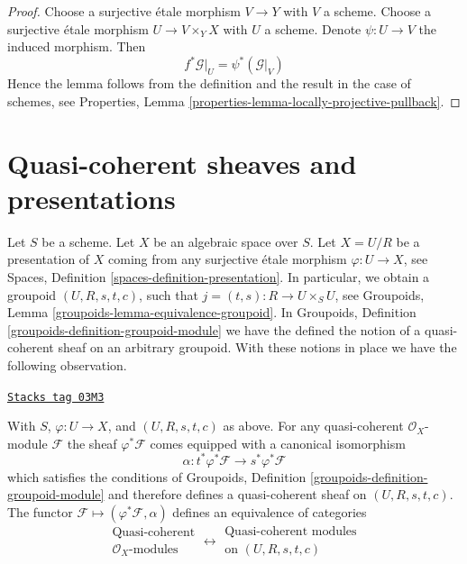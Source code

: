 \begin{proof}
Choose a surjective \'etale morphism $V \to Y$ with $V$ a scheme.
Choose a surjective \'etale morphism $U \to V \times_Y X$ with
$U$ a scheme. Denote $\psi : U \to V$ the induced morphism.
Then
$$
f^*\mathcal{G}|_U = \psi^*(\mathcal{G}|_V)
$$
Hence the lemma follows from the definition and the result in the
case of schemes, see
Properties, Lemma \ref{properties-lemma-locally-projective-pullback}.
\end{proof}

\section{Quasi-coherent sheaves and presentations}
\label{spaces-properties-section-quasi-coherent-presentation}
Let $S$ be a scheme. Let $X$ be an algebraic space over $S$.
Let $X = U/R$ be a presentation of $X$ coming from any surjective
\'etale morphism $\varphi : U \to X$, see
Spaces, Definition \ref{spaces-definition-presentation}.
In particular, we obtain a groupoid $(U, R, s, t, c)$, such that
$j = (t, s) : R \to U \times_S U$, see
Groupoids, Lemma \ref{groupoids-lemma-equivalence-groupoid}.
In
Groupoids, Definition \ref{groupoids-definition-groupoid-module}
we have the defined the notion of a quasi-coherent sheaf
on an arbitrary groupoid. With these notions in place we have
the following observation.

\begin{proposition}
\label{spaces-properties-proposition-quasi-coherent}
\href{https://stacks.math.columbia.edu/tag/03M3}{\texttt{Stacks tag 03M3}}

With $S$, $\varphi : U \to X$, and $(U, R, s, t, c)$ as above.
For any quasi-coherent $\mathcal{O}_X$-module $\mathcal{F}$ the
sheaf $\varphi^*\mathcal{F}$ comes equipped with a canonical
isomorphism
$$
\alpha : t^*\varphi^*\mathcal{F} \longrightarrow s^*\varphi^*\mathcal{F}
$$
which satisfies the conditions of
Groupoids, Definition \ref{groupoids-definition-groupoid-module}
and therefore defines a quasi-coherent sheaf on $(U, R, s, t, c)$.
The functor $\mathcal{F} \mapsto (\varphi^*\mathcal{F}, \alpha)$
defines an equivalence of categories
$$
\begin{matrix}
\text{Quasi-coherent} \\
\mathcal{O}_X\text{-modules}
\end{matrix}
\longleftrightarrow
\begin{matrix}
\text{Quasi-coherent modules}\\
\text{on }(U, R, s, t, c)
\end{matrix}
$$
\end{proposition}

